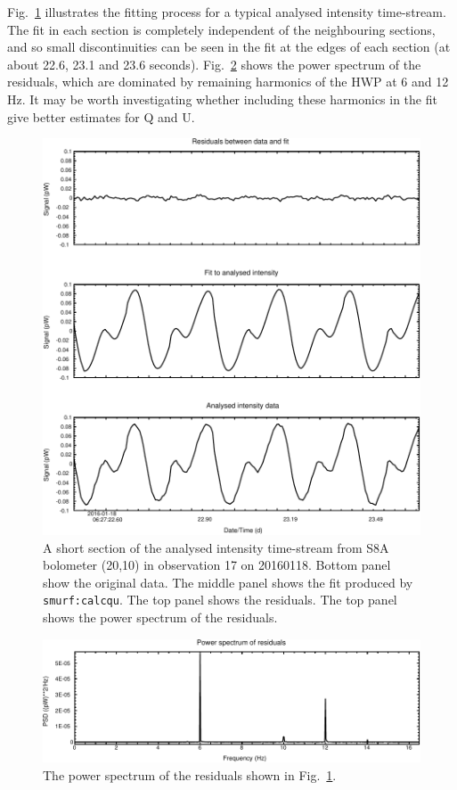 \documentclass[twoside,11pt]{starlink}
\begin{document}
Fig.~\ref{fig:fit} illustrates the fitting process for a typical analysed
intensity time-stream. The fit in each section is completely independent
of the neighbouring sections, and so small discontinuities can be seen in
the fit at the edges of each section (at about 22.6, 23.1 and 23.6 seconds).
Fig.~\ref{fig:fitfft} shows the power spectrum of the
residuals, which are dominated by remaining harmonics of the HWP at 6 and
12 Hz. It may be worth investigating whether including these harmonics in
the fit give better estimates for Q and U.

\begin{figure}
\includegraphics[width=\columnwidth]{fit}
\caption{A short section of the analysed intensity time-stream from S8A
bolometer (20,10) in observation 17 on 20160118. Bottom panel show the
original data. The middle panel shows the fit produced by
\texttt{smurf:calcqu}. The top panel shows the residuals. The top panel
shows the power spectrum of the residuals.}
\label{fig:fit}
\end{figure}

\begin{figure}
\includegraphics[width=\columnwidth]{fitfft}
\caption{The power spectrum of the residuals shown in Fig.~\ref{fig:fit}.}
\label{fig:fitfft}
\end{figure}
\end{document}
